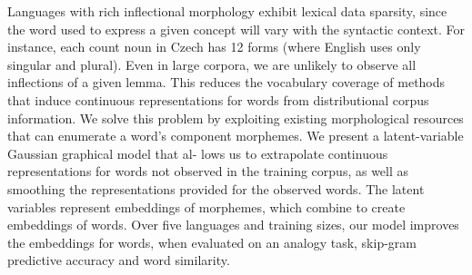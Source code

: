 Languages with rich inflectional morphology exhibit lexical data sparsity, since the word used to express a given concept will vary with the syntactic context. For instance, each count noun in Czech has 12 forms (where English uses only singular and plural). Even in large corpora, we are unlikely to observe all inflections of a given lemma. This reduces the vocabulary coverage of methods that induce continuous representations for words from distributional corpus information. We solve this problem by exploiting existing morphological resources that can enumerate a word's component morphemes. We present a latent-variable Gaussian graphical model that al- lows us to extrapolate continuous representations for words not observed in the training corpus, as well as smoothing the representations provided for the observed words. The latent variables represent embeddings of morphemes, which combine to create embeddings of words. Over five languages and training sizes, our model improves the embeddings for words, when evaluated on an analogy task, skip-gram predictive accuracy and word similarity.
